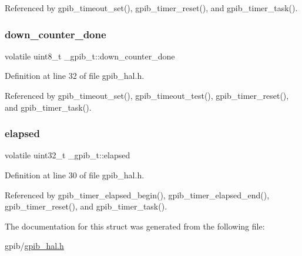 Referenced by gpib\+\_\+timeout\+\_\+set(), gpib\+\_\+timer\+\_\+reset(), and gpib\+\_\+timer\+\_\+task().

\mbox{\label{struct__gpib__t_af2622dd8668ecb24c42a2da2d8956538}} 
\subsubsection{\texorpdfstring{down\+\_\+counter\+\_\+done}{down\_counter\_done}}
{\footnotesize\ttfamily volatile uint8\+\_\+t \+\_\+gpib\+\_\+t\+::down\+\_\+counter\+\_\+done}



Definition at line 32 of file gpib\+\_\+hal.\+h.



Referenced by gpib\+\_\+timeout\+\_\+set(), gpib\+\_\+timeout\+\_\+test(), gpib\+\_\+timer\+\_\+reset(), and gpib\+\_\+timer\+\_\+task().

\mbox{\label{struct__gpib__t_a99a38aef880eb075f625f33d7bac31dd}} 
\subsubsection{\texorpdfstring{elapsed}{elapsed}}
{\footnotesize\ttfamily volatile uint32\+\_\+t \+\_\+gpib\+\_\+t\+::elapsed}



Definition at line 30 of file gpib\+\_\+hal.\+h.



Referenced by gpib\+\_\+timer\+\_\+elapsed\+\_\+begin(), gpib\+\_\+timer\+\_\+elapsed\+\_\+end(), gpib\+\_\+timer\+\_\+reset(), and gpib\+\_\+timer\+\_\+task().



The documentation for this struct was generated from the following file\+:\begin{DoxyCompactItemize}
\item 
gpib/\hyperlink{gpib__hal_8h}{gpib\+\_\+hal.\+h}\end{DoxyCompactItemize}
